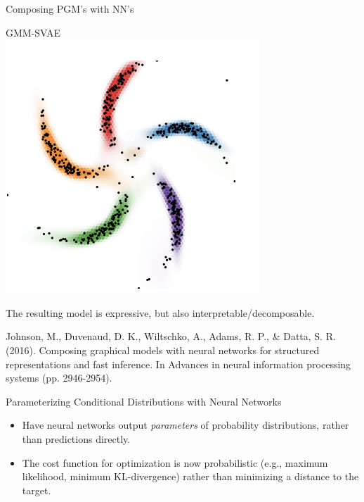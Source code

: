\documentclass[10pt]{beamer}
\begin{document}
\begin{frame}{Composing PGM's with NN's}
\begin{minipage}[t][.9\textheight]{\textwidth}
\begin{minipage}[t]{.3\textwidth}
\begin{center}
  \end{center}
 \end{minipage}  \hfill
  \begin{minipage}[t]{.3\textwidth}
  \begin{center}
  GMM-SVAE \\
  \includegraphics[width=.7\textwidth]{images/example_composed_gmm}
  \end{center}
 \end{minipage} 

\vspace{.2in}
\vfill
The resulting model is expressive, but also interpretable/decomposable.\\

\vfill 

\tiny Johnson, M., Duvenaud, D. K., Wiltschko, A., Adams, R. P., \& Datta, S. R. (2016). Composing graphical models with neural networks for structured representations and fast inference. In Advances in neural information processing systems (pp. 2946-2954).
\end{minipage}

\end{frame}


\begin{frame}{Parameterizing Conditional Distributions with Neural Networks}

\begin{itemize}
\item Have neural networks output \textit{parameters} of probability distributions, rather than predictions directly. \pause 
\item The cost function for optimization is now probabilistic (e.g., maximum likelihood, minimum KL-divergence) rather than minimizing a distance to the target.
\end{itemize}


\end{frame}
\end{document}
